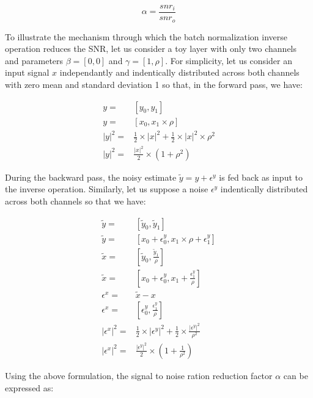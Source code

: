 \documentclass[twocolumn]{bmcart}
\begin{document}
\begin{equation}
\alpha = \frac{snr_i}{snr_o}
\end{equation}

To illustrate the mechanism through which the batch normalization inverse operation reduces the SNR, let us consider a toy layer with only two channels and parameters $\beta=[0,0]$ and $\gamma = [1, \rho]$. For simplicity, let us consider an input signal $x$ independantly and indentically distributed across both channels with zero mean and standard deviation 1 so that, in the forward pass, we have:

\begin{subequations}
\begin{align}
 y =& [y_0, y_1] \\
 y =& [x_0, x_1 \times \rho] \\
 |y|^2 =& \frac{1}{2} \times |x|^2 + \frac{1}{2} \times |x|^2 \times \rho^2 \\
 |y|^2 =&\frac{|x|^2}{2} \times (1+\rho^2)
\end{align}
\end{subequations}

During the backward pass, the noisy estimate $\tilde{y}=y+\epsilon^y$ is fed back as input to the inverse operation. 
Similarly, let us suppose a noise $\epsilon^y$ indentically distributed across both channels so that we have:

\begin{subequations}
\begin{align}
\tilde{y}       =& [ \tilde{y}_0, \tilde{y}_1 ] \\
\tilde{y}       =& [ x_0 + \epsilon_0^y, x_1 \times \rho + \epsilon_1^y ] \\
\tilde{x}       =& [ \tilde{y}_0, \frac{\tilde{y}_1}{\rho}] \\
\tilde{x}       =& [ x_0 + \epsilon_{0}^y, x_1 + \frac{\epsilon_{1}^y}{\rho} ]\\
\epsilon^x      =& \tilde{x} - x\\
\epsilon^x      =& [ \epsilon_0^y, \frac{\epsilon_{1}^y}{\rho} ]\\
|\epsilon^x|^2  =& \frac{1}{2} \times |\epsilon^y|^2 + \frac{1}{2} \times \frac{|\epsilon^y|^2}{\rho^2} \\
|\epsilon^x|^2  =& \frac{|\epsilon^y|^2}{2} \times (1 + \frac{1}{\rho^2})
\end{align}
\end{subequations}

Using the above formulation, the signal to noise ration reduction factor $\alpha$ can be expressed as:
\end{document}
